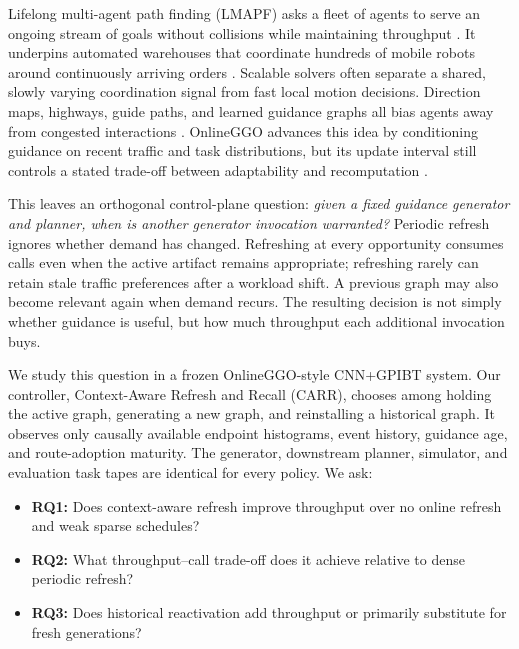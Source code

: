 \documentclass[sigconf,anonymous,review]{acmart}
\newcommand{\carr}{\textsc{CARR}}
\begin{document}
Lifelong multi-agent path finding (LMAPF) asks a fleet of agents to serve an
ongoing stream of goals without collisions while maintaining throughput
\cite{ma2017lifelong}. It underpins automated warehouses that coordinate
hundreds of mobile robots around continuously arriving orders
\cite{wurman2008warehouses}. Scalable solvers often separate a shared, slowly
varying coordination signal from fast local motion decisions. Direction maps,
highways, guide paths, and learned guidance graphs all bias agents away from
congested interactions \cite{jansen2008direction,cohen2015highways,
chen2024traffic,ijcai2024p0035}. OnlineGGO advances this idea by conditioning
guidance on recent traffic and task distributions, but its update interval
still controls a stated trade-off between adaptability and recomputation
\cite{zang2025online}.

This leaves an orthogonal control-plane question: \emph{given a fixed guidance
generator and planner, when is another generator invocation warranted?}
Periodic refresh ignores whether demand has changed. Refreshing at every
opportunity consumes calls even when the active artifact remains appropriate;
refreshing rarely can retain stale traffic preferences after a workload
shift. A previous graph may also become relevant again when demand recurs.
The resulting decision is not simply whether guidance is useful, but how much
throughput each additional invocation buys.

We study this question in a frozen OnlineGGO-style CNN+GPIBT system. Our
controller, Context-Aware Refresh and Recall (\carr), chooses among holding the
active graph, generating a new graph, and reinstalling a historical graph.
It observes only causally available endpoint histograms, event history,
guidance age, and route-adoption maturity. The generator, downstream planner,
simulator, and evaluation task tapes are identical for every policy. We ask:

\begin{itemize}
  \item \textbf{RQ1:} Does context-aware refresh improve throughput over no
  online refresh and weak sparse schedules?
  \item \textbf{RQ2:} What throughput--call trade-off does it achieve relative
  to dense periodic refresh?
  \item \textbf{RQ3:} Does historical reactivation add throughput or primarily
  substitute for fresh generations?
\end{itemize}
\end{document}
